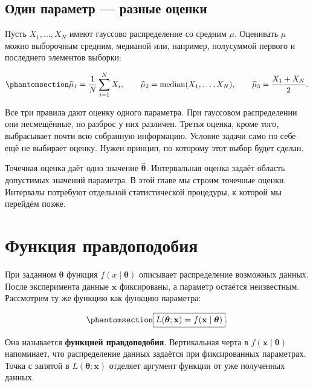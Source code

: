 \documentclass[
  russian,
  11pt,
  a4paper,
  open=any]{scrbook}
\begin{document}
\subsection{Один параметр --- разные
оценки}\label{ux43eux434ux438ux43d-ux43fux430ux440ux430ux43cux435ux442ux440-ux440ux430ux437ux43dux44bux435-ux43eux446ux435ux43dux43aux438}

Пусть \(X_1,\ldots,X_N\) имеют гауссово распределение со средним
\(\mu\). Оценивать \(\mu\) можно выборочным средним, медианой или,
например, полусуммой первого и последнего элементов выборки:

\begin{equation}\protect\phantomsection\label{eq-ch9-three-estimators}{
\widehat\mu_1=\frac1N\sum_{i=1}^{N}X_i,
\qquad
\widehat\mu_2=\operatorname{median}(X_1,\ldots,X_N),
\qquad
\widehat\mu_3=\frac{X_1+X_N}{2}.
}\end{equation}

Все три правила дают оценку одного параметра. При гауссовом
распределении они несмещённые, но разброс у них различен. Третья оценка,
кроме того, выбрасывает почти всю собранную информацию. Условие задачи
само по себе ещё не выбирает оценку. Нужен принцип, по которому этот
выбор будет сделан.

Точечная оценка даёт одно значение \(\widehat{\boldsymbol\theta}\).
Интервальная оценка задаёт область допустимых значений параметра. В этой
главе мы строим точечные оценки. Интервалы потребуют отдельной
статистической процедуры, к которой мы перейдём позже.

\section{Функция
правдоподобия}\label{ux444ux443ux43dux43aux446ux438ux44f-ux43fux440ux430ux432ux434ux43eux43fux43eux434ux43eux431ux438ux44f}

При заданном \(\boldsymbol\theta\) функция \(f(x\mid\boldsymbol\theta)\)
описывает распределение возможных данных. После эксперимента данные
\(\mathbf x\) фиксированы, а параметр остаётся неизвестным. Рассмотрим
ту же функцию как функцию параметра:

\begin{equation}\protect\phantomsection\label{eq-ch9-likelihood-definition}{
\boxed{
L(\boldsymbol\theta;\mathbf x)
=f(\mathbf x\mid\boldsymbol\theta)
}.
}\end{equation}

Она называется \textbf{функцией правдоподобия}. Вертикальная черта в
\(f(\mathbf x\mid\boldsymbol\theta)\) напоминает, что распределение
данных задаётся при фиксированных параметрах. Точка с запятой в
\(L(\boldsymbol\theta;\mathbf x)\) отделяет аргумент функции от уже
полученных данных.
\end{document}
